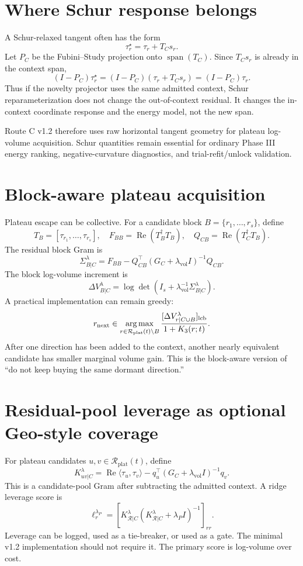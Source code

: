 \documentclass[10pt,twocolumn]{article}
\newcommand{\Span}{\operatorname{span}}
\newcommand{\Ree}{\operatorname{Re}}
\newcommand{\argmax}{\operatorname*{arg\,max}}
\newcommand{\lcb}{\mathrm{lcb}}
\newcommand{\plat}{\mathrm{plat}}
\newcommand{\vol}{\mathrm{vol}}
\begin{document}
\section{Where Schur response belongs}

A Schur-relaxed tangent often has the form
\[
\tau_r^\star=\tau_r+T_Cs_r.
\]
Let $P_C$ be the Fubini--Study projection onto $\Span(T_C)$. Since $T_Cs_r$ is
already in the context span,
\[
(I-P_C)\tau_r^\star=(I-P_C)(\tau_r+T_Cs_r)=(I-P_C)\tau_r.
\]
Thus if the novelty projector uses the same admitted context, Schur
reparameterization does not change the out-of-context residual. It changes the
in-context coordinate response and the energy model, not the new span.

Route C v1.2 therefore uses raw horizontal tangent geometry for plateau
log-volume acquisition. Schur quantities remain essential for ordinary Phase III
energy ranking, negative-curvature diagnostics, and trial-refit/unlock
validation.

\section{Block-aware plateau acquisition}

Plateau escape can be collective. For a candidate block
$B=\{r_1,\ldots,r_s\}$, define
\[
T_B=[\tau_{r_1},\ldots,\tau_{r_s}],
\quad
F_{BB}=\Ree(T_B^\dagger T_B),
\quad
Q_{CB}=\Ree(T_C^\dagger T_B).
\]
The residual block Gram is
\[
\Sigma_{B|C}^{\lambda}
=F_{BB}-Q_{CB}^\top(G_C+\lambda_{\vol}I)^{-1}Q_{CB}.
\]
The block log-volume increment is
\[
\Delta V_{B|C}^{\lambda}
=\log\det(I_s+\lambda_{\vol}^{-1}\Sigma_{B|C}^{\lambda}).
\]
A practical implementation can remain greedy:
\[
r_{\rm next}\in\argmax_{r\in\mathcal R_{\plat}(t)\setminus B}
\frac{[\Delta V_{r|C\cup B}^{\lambda}]_{\lcb}}{1+K_3(r;t)}.
\]
After one direction has been added to the context, another nearly equivalent
candidate has smaller marginal volume gain. This is the block-aware version of
``do not keep buying the same dormant direction.''

\section{Residual-pool leverage as optional Geo-style coverage}

For plateau candidates $u,v\in\mathcal R_{\plat}(t)$, define
\[
K_{uv|C}^{\lambda}=\Ree\langle\tau_u,\tau_v\rangle
-q_u^\top(G_C+\lambda_{\vol}I)^{-1}q_v.
\]
This is a candidate-pool Gram after subtracting the admitted context. A ridge
leverage score is
\[
\ell_r^{\lambda_P}=
\left[K_{\mathcal R|C}^{\lambda}
(K_{\mathcal R|C}^{\lambda}+\lambda_PI)^{-1}\right]_{rr}.
\]
Leverage can be logged, used as a tie-breaker, or used as a gate. The minimal
v1.2 implementation should not require it. The primary score is log-volume over
cost.
\end{document}
